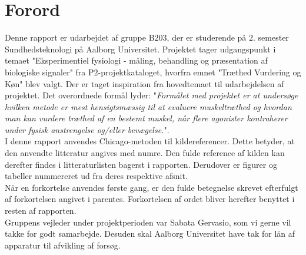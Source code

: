 \chapter*{Forord}
Denne rapport er udarbejdet af gruppe B$203$, der er studerende på $2$. semester Sundhedsteknologi på Aalborg Universitet. Projektet tager udgangspunkt i temaet "Eksperimentiel fysiologi - måling, behandling og præsentation af biologiske signaler"   fra P$2$-projektkataloget, hvorfra emnet "Træthed Vurdering og Køn"  blev valgt. Der er taget inspiration fra hovedtemaet til udarbejdelsen af projektet. Det overordnede formål lyder: "\textit{Formålet med projektet er at undersøge hvilken metode er mest hensigtsmæssig til at evaluere muskeltræthed og hvordan man kan vurdere træthed af en bestemt muskel, når flere agonister kontraherer under fysisk anstrengelse og/eller bevægelse.}"\cite{ProjektKatalog}. \\
I denne rapport anvendes Chicago-metoden til kildereferencer. Dette betyder, at den anvendte litteratur angives med numre. Den fulde reference af kilden kan derefter findes i litteraturlisten bagerst i rapporten. Derudover er figurer og tabeller nummereret ud fra deres respektive afsnit. \\
Når en forkortelse anvendes første gang, er den fulde betegnelse skrevet efterfulgt af forkortelsen angivet i parentes. Forkortelsen af ordet bliver herefter benyttet i resten af rapporten. \\
Gruppens vejleder under projektperioden var Sabata Gervasio, som vi gerne vil takke for godt samarbejde. Desuden skal Aalborg Universitet have tak for lån af apparatur til afvikling af forsøg. %
